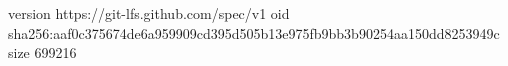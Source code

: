 version https://git-lfs.github.com/spec/v1
oid sha256:aaf0c375674de6a959909cd395d505b13e975fb9bb3b90254aa150dd8253949c
size 699216
